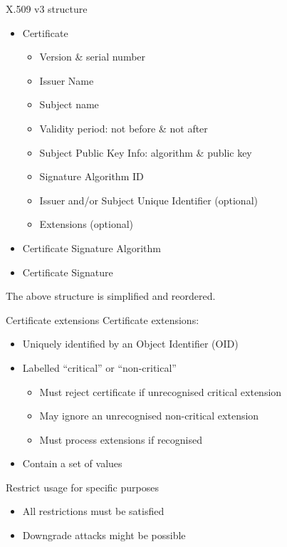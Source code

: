 \begin{frame}{X.509 v3 structure}
  \begin{itemize}[<+(1)->]
    \item Certificate
    \begin{itemize}
      \item Version \& serial number
      \item Issuer Name
      \item Subject name
      \item Validity period: not before \& not after
      \item Subject Public Key Info: algorithm \& public key
      \item Signature Algorithm ID
      \item Issuer and/or Subject Unique Identifier (optional)
      \item Extensions (optional)
    \end{itemize}
    \item Certificate Signature Algorithm
    \item Certificate Signature
  \end{itemize}

  \pause
  The above structure is simplified and reordered.
\end{frame}

\begin{frame}{Certificate extensions}
  Certificate extensions:
  \begin{itemize}[<+(1)->]
    \item Uniquely identified by an Object Identifier (OID)
    \item Labelled \enquote{critical} or \enquote{non-critical}
    \begin{itemize}
      \item Must reject certificate if unrecognised critical extension
      \item May ignore an unrecognised non-critical extension
      \item Must process extensions if recognised
    \end{itemize}
    \item Contain a set of values
  \end{itemize}

  \pause
  Restrict usage for specific purposes
  \begin{itemize}[<+(1)->]
    \item All restrictions must be satisfied
    \item Downgrade attacks might be possible
  \end{itemize}
\end{frame}

